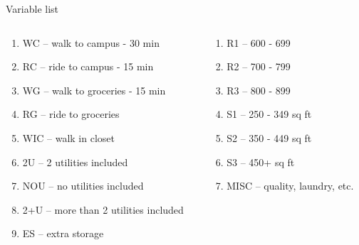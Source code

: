 \documentclass[aspectratio=1610,pdftex,dvipsnames,compress,xcolor={dvipsnames}]{beamer}
\begin{document}
\addtocounter{framenumber}{-1}
\begin{frame}{Variable list}
    \begin{columns}[t]

        \begin{column}{0.50\textwidth}
            \begin{enumerate}[series=outerlist,topsep=0pt,itemsep=3pt,leftmargin=*,label=(\arabic*)]
                \item[]WC -- walk to campus - 30 min
                \item[]RC -- ride to campus - 15 min
                \item[]WG -- walk to groceries - 15 min
                \item[]RG -- ride to groceries
                \item[]WIC -- walk in closet
                \item[]2U -- 2 utilities included
                \item[]NOU -- no utilities included
                \item[]2+U -- more than 2 utilities included
                \item[]ES -- extra storage
            \end{enumerate}
        \end{column}

        \begin{column}{0.50\textwidth}
            \begin{enumerate}[series=outerlist,topsep=0pt,itemsep=3pt,leftmargin=*,label=(\arabic*)]
                \item[]R1 -- 600 - 699
                \item[]R2 -- 700 - 799
                \item[]R3 -- 800 - 899
                \item[]S1 -- 250 - 349 sq ft
                \item[]S2 -- 350 - 449 sq ft
                \item[]S3 -- 450+ sq ft
                \item[]MISC -- quality, laundry, etc.
            \end{enumerate}
        \end{column}

    \end{columns}
\end{frame}
\end{document}
